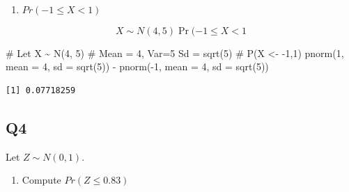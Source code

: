 \documentclass[
]{article}
\newenvironment{Shaded}{\begin{snugshade}}{\end{snugshade}}
\newcommand{\AttributeTok}[1]{\textcolor[rgb]{0.40,0.45,0.13}{#1}}
\newcommand{\CommentTok}[1]{\textcolor[rgb]{0.37,0.37,0.37}{#1}}
\newcommand{\DecValTok}[1]{\textcolor[rgb]{0.68,0.00,0.00}{#1}}
\newcommand{\FunctionTok}[1]{\textcolor[rgb]{0.28,0.35,0.67}{#1}}
\newcommand{\NormalTok}[1]{\textcolor[rgb]{0.00,0.23,0.31}{#1}}
\newcommand{\SpecialCharTok}[1]{\textcolor[rgb]{0.37,0.37,0.37}{#1}}
\providecommand{\tightlist}{%
  \setlength{\itemsep}{0pt}\setlength{\parskip}{0pt}}
\begin{document}
\begin{enumerate}
\def\labelenumi{(\alph{enumi})}
\setcounter{enumi}{2}
\tightlist
\item
  \(Pr(-1\leq X< 1)\)
\end{enumerate}

\begin{tcolorbox}[enhanced jigsaw, arc=.35mm, bottomrule=.15mm, breakable, colback=white, colframe=quarto-callout-tip-color-frame, left=2mm, leftrule=.75mm, opacityback=0, rightrule=.15mm, toprule=.15mm]

\[X\sim N(4,5)\Pr(-1\leq X< 1\]

\begin{Shaded}
\begin{Highlighting}[]
\CommentTok{\# Let X \textasciitilde{} N(4, 5)}
\CommentTok{\# Mean = 4, Var=5 Sd = sqrt(5)}
\CommentTok{\# P(X \textless{}{-} {-}1,1)}
\FunctionTok{pnorm}\NormalTok{(}\DecValTok{1}\NormalTok{, }\AttributeTok{mean =} \DecValTok{4}\NormalTok{, }\AttributeTok{sd =} \FunctionTok{sqrt}\NormalTok{(}\DecValTok{5}\NormalTok{)) }\SpecialCharTok{{-}}
  \FunctionTok{pnorm}\NormalTok{(}\SpecialCharTok{{-}}\DecValTok{1}\NormalTok{, }\AttributeTok{mean =} \DecValTok{4}\NormalTok{, }\AttributeTok{sd =} \FunctionTok{sqrt}\NormalTok{(}\DecValTok{5}\NormalTok{))}
\end{Highlighting}
\end{Shaded}

\begin{verbatim}
[1] 0.07718259
\end{verbatim}

\end{tcolorbox}

\subsection{Q4}\label{q4}

Let \(Z\sim N(0,1)\).

\begin{enumerate}
\def\labelenumi{(\alph{enumi})}
\tightlist
\item
  Compute \(Pr(Z\leq 0.83)\)
\end{enumerate}
\end{document}
